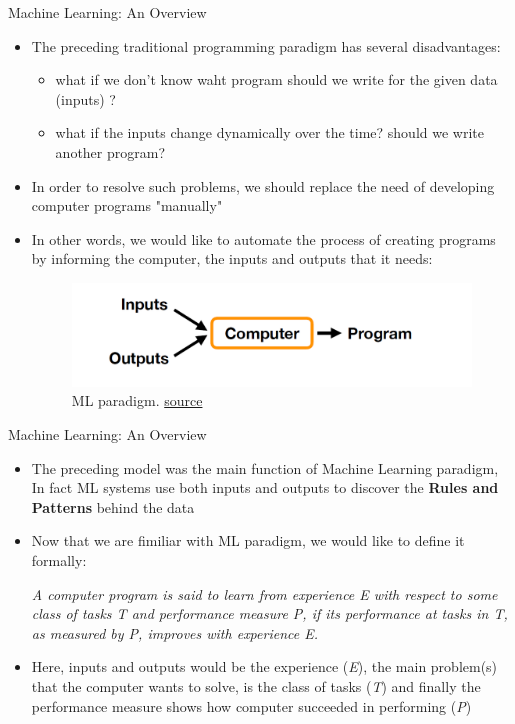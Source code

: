 \documentclass[compress,oilve]{beamer}
\begin{document}
\begin{frame}{Machine Learning: An Overview}
\begin{itemize}
\item The preceding traditional programming paradigm has several disadvantages:
	\begin{itemize}
	\item what if we don't know waht program should we write for the given data (inputs) ?
	\item what if the inputs change dynamically over the time? should we write another program? 
	\end{itemize}
\item In order to resolve such problems, we should replace the need of developing computer programs "manually"
\item In other words, we would like to automate the process of creating programs by informing the computer, the inputs and outputs that it needs:
\begin{center}
\begin{figure}
\includegraphics[scale=0.5]{2}
\center \caption{ML paradigm. \href{https://sebastianraschka.com/faq/docs/datascience-ml.html}{source}}
\end{figure}
\end{center}
\end{itemize}
\end{frame}

\begin{frame}{Machine Learning: An Overview}
\begin{itemize}
\item The preceding model was the main function of Machine Learning paradigm, In fact ML systems use both inputs and outputs to discover the \textbf{Rules and Patterns} behind the data 
\item Now that we are fimiliar with ML paradigm, we would like to define it formally:
\begin{center}\textit{A computer program is said to learn from experience E with respect to some
class of tasks T and performance measure P, if its performance at tasks in T, as
measured by P, improves with experience E.}
\end{center}
\item Here, inputs and outputs would be the experience (\textit{E}), the main problem(s) that the computer wants to solve, is the class of tasks (\textit{T}) and finally the performance measure shows how computer succeeded in performing (\textit{P})
\end{itemize}
\end{frame}
\end{document}
